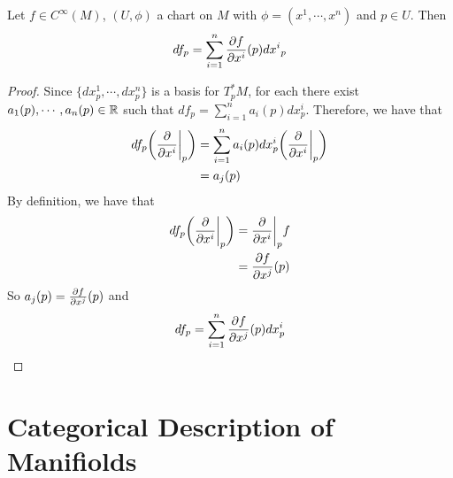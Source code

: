 \documentclass{book}
\begin{document}
	\begin{ex}
		Let $f \in C^{\infty}(M)$, $(U, \phi)$ a chart on $M$ with $\phi = (x^1, \cdots, x^n)$ and $p \in U$. Then $$df_p = \sum_{i=1}^n \frac{\partial f}{\partial x^i}(p) {dx^i}_p$$
	\end{ex}

	\begin{proof}
		 Since $\{dx^1_p, \cdots, dx^n_p\}$ is a basis for $T^*_pM$, for each there exist $a_1(p), \cdots, a_n(p) \in \mathbb{R}$ such that $df_p = \sum\limits_{i=1}^n a_i(p)dx^i_p$. Therefore, we have that 
		\begin{align*}
			df_p \bigg(\frac{\partial}{\partial x^i} \bigg|_p \bigg) 
			&= \sum\limits_{i=1}^n a_i(p)dx^i_p \bigg(\frac{\partial}{\partial x^i} \bigg|_p \bigg)  \\
			&=  a_j(p)
		\end{align*}
		By definition, we have that 
		\begin{align*}
			df_p\bigg(\frac{\partial}{\partial x^i} \bigg|_p \bigg) 
			&= \frac{\partial}{\partial x^i} \bigg|_p f \\ 
			&= \frac{\partial f}{\partial x^j}(p)\\
		\end{align*}
		So $a_j(p) = \frac{\partial f}{\partial x^j} (p)$ and $$df_p = \sum\limits_{i=1}^n \frac{\partial f}{\partial x^j} (p)dx^i_p$$
	\end{proof}
		
	
	
	
	
	
	
	
	
	
	
	
	
	
	
	
	
	
	
	
	
	
	
	
	
	
	
	
	
	
	
	
	
	
	
	
	
	
	
	
	
	
	
	
	
	
	
	\newpage
	\chapter{Categorical Description of Manifiolds}
	
\end{document}
